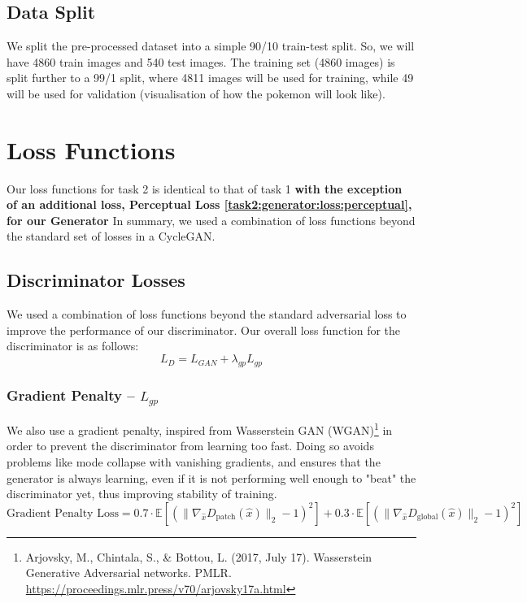 \documentclass[twoside,english,notitlepage]{report}
\begin{document}
\subsection{Data Split}

We split the pre-processed dataset into a simple 90/10 train-test split. So, we will have 4860 train images and 540 test images. The training set (4860 images) is split further to a 99/1 split, where 4811 images will be used for training, while 49 will be used for validation (visualisation of how the pokemon will look like). 


\section{Loss Functions}
Our loss functions for task 2 is identical to that of task 1 \textbf{with the exception of an additional loss, Perceptual Loss \ref{task2:generator:loss:perceptual}, for our Generator } In summary, we used a combination of loss functions beyond the standard set of losses in a CycleGAN. 

\subsection{Discriminator Losses}
We used a combination of loss functions beyond the standard adversarial loss to improve the performance of our discriminator. Our overall loss function for the discriminator is as follows:
\begin{equation}
    L_{D} = L_{GAN} + \lambda_{gp} L_{gp}
\end{equation}

\subsubsection{Gradient Penalty – $L_{gp}$}
We also use a gradient penalty, inspired from Wasserstein GAN (WGAN)\footnote{Arjovsky, M., Chintala, S., \& Bottou, L. (2017, July 17). Wasserstein Generative Adversarial networks. PMLR. \href{https://proceedings.mlr.press/v70/arjovsky17a.html}{https://proceedings.mlr.press/v70/arjovsky17a.html}} in order to prevent the discriminator from learning too fast. Doing so avoids problems like mode collapse with vanishing gradients, and ensures that the generator is always learning, even if it is not performing well enough to "beat" the discriminator yet, thus improving stability of training.
\begin{equation*}
    \text{Gradient Penalty Loss} = 0.7 \cdot \mathbb{E} \left[ \left( \| \nabla_{\hat{x}} D_{\text{patch}} (\hat{x}) \|_2 - 1 \right)^2 \right] + 0.3 \cdot \mathbb{E} \left[ \left( \| \nabla_{\hat{x}} D_{\text{global}} (\hat{x}) \|_2 - 1 \right)^2 \right]
\end{equation*}
\end{document}
